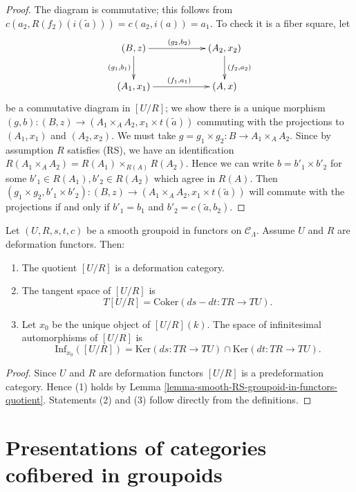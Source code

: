\begin{proof}
\medskip \noindent
The diagram is commutative; this follows from $c(a_2,R(f_2)(i(\widetilde{a}))) 
= c(a_2, i(a)) = a_1$. To check it is a fiber square, let
\[ 
\xymatrix{
(B, z) \ar[d]_{(g_1, b_1)} \ar[rr]^{(g_2, b_2)} & & (A_2, x_2) 
\ar[d]^{(f_2,a_2)} \\
(A_1, x_1) \ar[rr]^{(f_1,a_1)} && (A,x) 
}
\]
be a commutative diagram in $[U/R]$; we show there is a unique morphism $(g,b): 
(B, z) \to (A_1 \times_{A} A_2, x_1 \times t(\widetilde{a}))$ commuting 
with the projections to $(A_1,x_1)$ and $(A_2,x_2)$. We must take $g = g_1 
\times g_2: B \to A_1 \times_{A} A_2$.  Since by assumption $R$ 
satisfies (RS), we have an identification $R(A_1 \times_{A} A_2) = R(A_1) 
\times_{R(A)} R(A_2)$.  Hence we can write $b = b'_1 \times b'_2$ for some 
$b'_1 \in R(A_1), b'_2 \in R(A_2)$ which agree in $R(A)$. Then $(g_1 \times 
g_2, b'_1 \times b'_2): (B, z) \to (A_1 \times_{A} A_2, x_1 \times 
t(\widetilde{a}))$ will commute with the projections if and only if $b'_1 = 
b_1$ and $b'_2 = c(\widetilde{a}, b_2)$.
\end{proof}

\begin{lemma}
\label{lemma-deformation-groupoid-quotient}
Let $(U, R, s,t,c)$ be a smooth groupoid in functors on $\mathcal{C}_\Lambda$. 
Assume $U$ and $R$ are deformation functors. Then:
\begin{enumerate}
\item The quotient $[U/R]$ is a deformation category.
\item The tangent space of $[U/R]$ is 
\[ T[U/R] = \text{Coker}(ds-dt: TR \to TU).
\]
\item Let $x_0$ be the unique object of $[U/R](k)$.  The space of infinitesimal 
automorphisms of $[U/R]$ is 
\[ \text{Inf}_{x_0}([U/R]) = \text{Ker}(ds: TR \to TU) \cap 
\text{Ker}(dt: TR \to TU).  
\]
\end{enumerate}
\end{lemma}

\begin{proof}
Since $U$ and $R$ are deformation functors $[U/R]$ is a predeformation 
category. Hence (1) holds by Lemma 
\ref{lemma-smooth-RS-groupoid-in-functors-quotient}.  Statements (2) and (3) 
follow directly from the definitions.
\end{proof}







\section{Presentations of categories cofibered in groupoids}
\label{section-presentation-categories-cofibred-in-groupoids}

